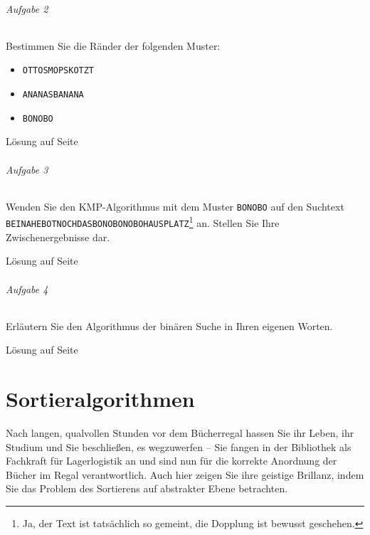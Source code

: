 \documentclass[11pt,a4paper]{scrartcl}
\begin{document}
\paragraph{Aufgabe 2} Bestimmen Sie die Ränder der folgenden Muster:
\begin{itemize}
\item \texttt{OTTOSMOPSKOTZT}
\item \texttt{ANANASBANANA}
\item \texttt{BONOBO}
\end{itemize}
\begin{flushright}
Lösung auf Seite \pageref{a2.2:lsg}
\end{flushright}
\paragraph{Aufgabe 3} Wenden Sie den KMP-Algorithmus mit dem Muster \texttt{BONOBO} auf den Suchtext \texttt{BEINAHEBOTNOCHDASBONOBONOBOHAUSPLATZ}\footnote{Ja, der Text ist tatsächlich so gemeint, die Dopplung ist bewusst geschehen.} an. Stellen Sie Ihre Zwischenergebnisse dar.
\begin{flushright}
Lösung auf Seite \pageref{a2.3:lsg}
\end{flushright}
\paragraph{Aufgabe 4} Erläutern Sie den Algorithmus der binären Suche in Ihren eigenen Worten.
\begin{flushright}
Lösung auf Seite \pageref{a2.4:lsg}
\end{flushright}
\pagebreak
\part{Sortieralgorithmen}
Nach langen, qualvollen Stunden vor dem Bücherregal hassen Sie ihr Leben, ihr Studium und Sie beschließen, es wegzuwerfen -- Sie fangen in der Bibliothek als Fachkraft für Lagerlogistik an und sind nun für die korrekte Anordnung der Bücher im Regal verantwortlich. Auch hier zeigen Sie ihre geistige Brillanz, indem Sie das Problem des Sortierens auf abstrakter Ebene betrachten.
\end{document}
